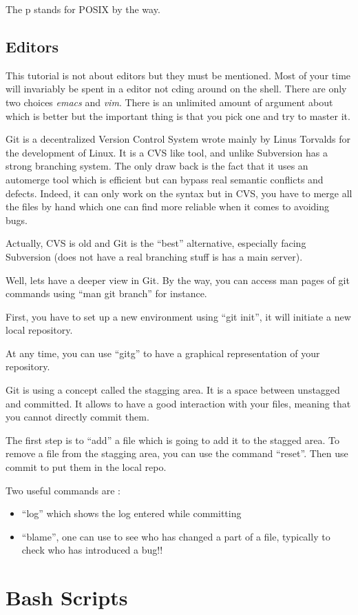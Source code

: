 \documentclass[10pt]{article}
\begin{document}
  The p stands for POSIX by the way.

  
  \subsection{Editors}
  This tutorial is not about editors but they must be mentioned. Most of your time will invariably be spent in a editor not cding around on the shell. There are only two choices \textit{emacs} and \textit{vim}. There is an unlimited amount of argument about which is better but the important thing is that you pick one and try to master it.
  

Git is a decentralized Version Control System wrote mainly by Linus Torvalds for the development of Linux.
It is a CVS like tool, and unlike Subversion has a strong branching system.
The only draw back is the fact that it uses an automerge tool which is efficient but can bypass real semantic conflicts and defects.
Indeed, it can only work on the syntax but in CVS, you have to merge all the files by hand which one can find more reliable when it comes to avoiding bugs.

Actually, CVS is old and Git is the ``best'' alternative, especially facing Subversion (does not have a real branching stuff is has a main server).

Well, lets have a deeper view in Git.
By the way, you can access man pages of git commands using ``man git branch'' for instance.

First, you have to set up a new environment using ``git init'', it will initiate a new local repository.

At any time, you can use ``gitg'' to have a graphical representation of your repository.

Git is using a concept called the stagging area. It is a space between unstagged and committed.
It allows to have a good interaction with your files, meaning that you cannot directly commit them.

The first step is to ``add'' a file which is going to add it to the stagged area.
To remove a file from the stagging area, you can use the command ``reset''.
Then use commit to put them in the local repo.

Two useful commands are :
\begin{itemize}
\item{``log'' which shows the log entered while committing}
\item{``blame'', one can use to see who has changed a part of a file, typically to check who has introduced a bug!!}
\end{itemize}

\section{Bash Scripts}





\end{document}
